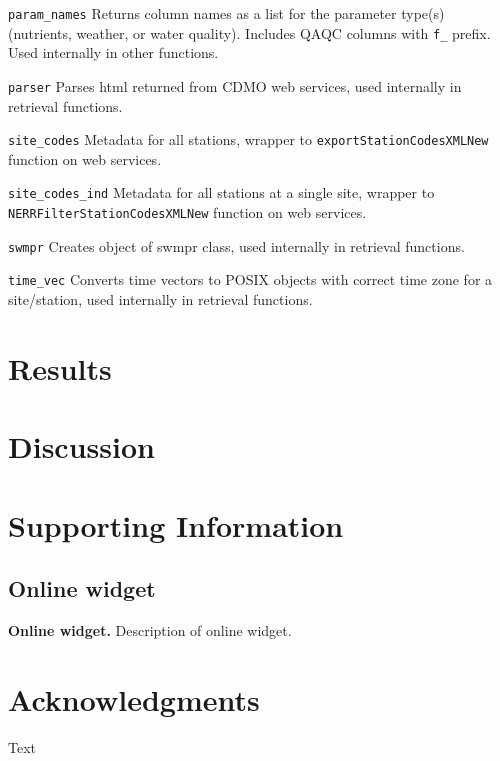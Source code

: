 \documentclass[10pt,letterpaper]{article}\usepackage[]{graphicx}\usepackage[]{color}
\begin{document}
\texttt{param\_names} Returns column names as a list for the parameter type(s) (nutrients, weather, or water quality).  Includes QAQC columns with \texttt{f\_} prefix. Used internally in other functions.

\texttt{parser} Parses html returned from CDMO web services, used internally in retrieval functions.

\texttt{site\_codes} Metadata for all stations, wrapper to \texttt{exportStationCodesXMLNew} function on web services.

\texttt{site\_codes\_ind} Metadata for all stations at a single site, wrapper  to \texttt{NERRFilterStationCodesXMLNew} function on web services.

\texttt{swmpr} Creates object of swmpr class, used internally in retrieval functions.

\texttt{time\_vec} Converts time vectors to POSIX objects with correct time zone for a site/station, used internally in retrieval functions.


\section*{Results}

\section*{Discussion}

\section*{Supporting Information}

\subsection*{Online widget}
\label{online_widget}
{\bf Online widget.} Description of online widget.

\section*{Acknowledgments}

Text

\nolinenumbers



\end{document}
